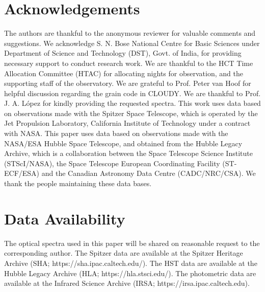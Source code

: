 \documentclass[a4paper,fleqn,usenatbib]{mnras}
\begin{document}
\section*{Acknowledgements}
The authors are thankful to the anonymous reviewer for valuable comments and suggestions. We acknowledge S. N. Bose National Centre for Basic Sciences under Department of Science and Technology (DST), Govt. of India, for providing necessary support to conduct research work. We are thankful to the HCT Time Allocation Committee (HTAC) for allocating nights for observation, and the supporting staff of the observatory. We are grateful to Prof. Peter van Hoof for helpful discussion regarding the grain code in CLOUDY. We are thankful to Prof. J. A. L{\'o}pez for kindly providing the requested spectra. This work uses data based on observations made with the Spitzer Space Telescope, which is operated by the Jet Propulsion Laboratory, California Institute of Technology under a contract with NASA. This paper uses data based on observations made with the NASA/ESA Hubble Space Telescope, and obtained from the Hubble Legacy Archive, which is a collaboration between the Space Telescope Science Institute (STScI/NASA), the Space Telescope European Coordinating Facility (ST-ECF/ESA) and the Canadian Astronomy Data Centre (CADC/NRC/CSA). We thank the people maintaining these data bases.

\section*{Data Availability}
The optical spectra used in this paper will be shared on reasonable request to the corresponding author. The Spitzer data are available at the Spitzer Heritage Archive (SHA; https://sha.ipac.caltech.edu/). The HST data are available at the Hubble Legacy Archive (HLA; https://hla.stsci.edu/). The photometric data are available at the Infrared Science Archive (IRSA; https://irsa.ipac.caltech.edu).   




\bsp	
\label{lastpage}
\end{document}
